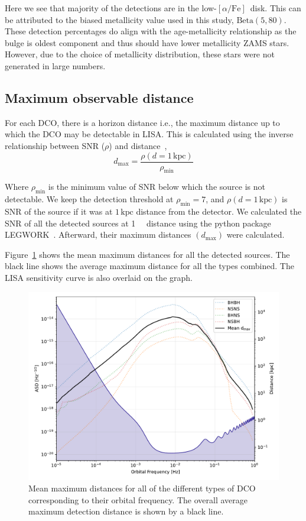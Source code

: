 \documentclass[twocolumn, twocolappendix]{aastex63}
\newcommand{\kpc}{\kilo\parsec}
\newcommand{\lowalpha}{low-$[\alpha/\text{Fe}]$}
\begin{document}
Here we see that majority of the detections are in the \lowalpha\ disk.
This can be attributed to the biased metallicity value used in this study, $\text{Beta}(5, 80)$.
These detection percentages do align with the age-metallicity relationship as the bulge is oldest component and thus should have lower metallicity ZAMS stars.
However, due to the choice of metallicity distribution, these stars were not generated in large numbers.

\subsection{Maximum observable distance}
\label{subsec:maximum-observable-distance}
For each DCO, there is a horizon distance i.e., the maximum distance up to which the DCO may be detectable in LISA\@.
This is calculated using the inverse relationship between SNR ($\rho$) and distance~\citep{Lau2020},
\begin{equation}
\label{eq:eq1}
d_\text{max}=\frac{\rho(d=1\,\text{kpc})}{\rho_\text{min}}
\end{equation}

Where $\rho_{\min}$ is the minimum value of SNR below which the source is not detectable.
We keep the detection threshold at $\rho_{\min}=7$, and $\rho(d=1\,\text{kpc})$ is SNR of the source if it was at $1\,\text{kpc}$ distance from the detector.
We calculated the SNR of all the detected sources at \SI{1}{\kpc} distance using the python package LEGWORK~\citep{Wagg2021LW}.
Afterward, their maximum distances $(d_{\max})$ were calculated.

Figure~\ref{fig:dmax} shows the mean maximum distances for all the detected sources.
The black line shows the average maximum distance for all the types combined.
The LISA sensitivity curve is also overlaid on the graph.

\begin{figure}[!h]%
	\centering
	\includegraphics[width=\columnwidth]{analysis_data/004__images_for_latex/d_max}
	\caption{Mean maximum distances for all of the different types of DCO corresponding to their orbital frequency. The overall average maximum detection distance is shown by a black line.}
	\label{fig:dmax}
\end{figure}%
\end{document}
